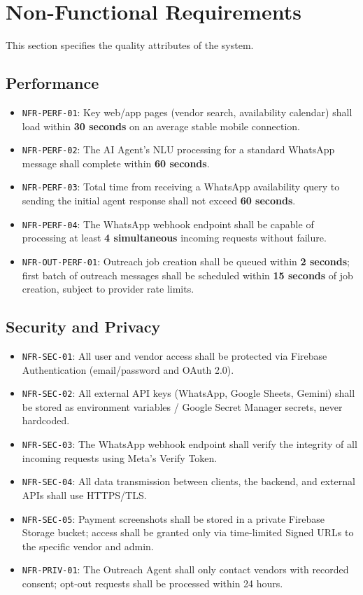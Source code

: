 \section{Non-Functional Requirements}

This section specifies the quality attributes of the system.

\subsection{Performance}
\begin{itemize}
  \item \texttt{NFR-PERF-01}: Key web/app pages (vendor search, availability calendar)
        shall load within \textbf{30 seconds} on an average stable mobile connection.
  \item \texttt{NFR-PERF-02}: The AI Agent's NLU processing for a standard WhatsApp
        message shall complete within \textbf{60 seconds}.
  \item \texttt{NFR-PERF-03}: Total time from receiving a WhatsApp availability query
        to sending the initial agent response shall not exceed \textbf{60 seconds}.
  \item \texttt{NFR-PERF-04}: The WhatsApp webhook endpoint shall be capable of
        processing at least \textbf{4 simultaneous} incoming requests without failure.
  \item \texttt{NFR-OUT-PERF-01}: Outreach job creation shall be queued within
        \textbf{2 seconds}; first batch of outreach messages shall be scheduled within
        \textbf{15 seconds} of job creation, subject to provider rate limits.
\end{itemize}

\subsection{Security and Privacy}
\begin{itemize}
  \item \texttt{NFR-SEC-01}: All user and vendor access shall be protected via
        Firebase Authentication (email/password and OAuth 2.0).
  \item \texttt{NFR-SEC-02}: All external API keys (WhatsApp, Google Sheets, Gemini)
        shall be stored as environment variables / Google Secret Manager secrets,
        never hardcoded.
  \item \texttt{NFR-SEC-03}: The WhatsApp webhook endpoint shall verify the integrity
        of all incoming requests using Meta's Verify Token.
  \item \texttt{NFR-SEC-04}: All data transmission between clients, the backend, and
        external APIs shall use HTTPS/TLS.
  \item \texttt{NFR-SEC-05}: Payment screenshots shall be stored in a private Firebase
        Storage bucket; access shall be granted only via time-limited Signed URLs to
        the specific vendor and admin.
  \item \texttt{NFR-PRIV-01}: The Outreach Agent shall only contact vendors with
        recorded consent; opt-out requests shall be processed within 24 hours.
\end{itemize}

